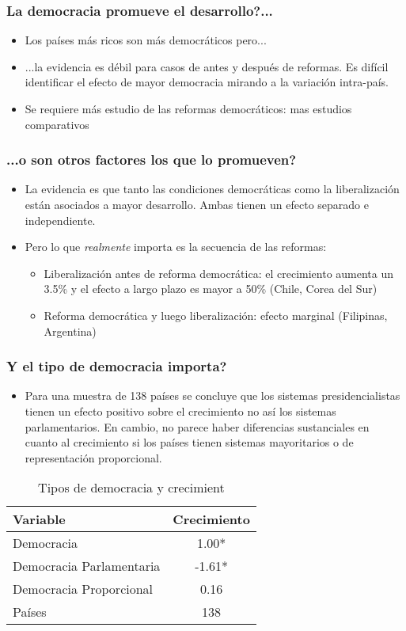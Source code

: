 \documentclass[handout,final,xcolor=dvipsnames]{beamer}
\begin{document}
\begin{frame}\frametitle{La democracia promueve el desarrollo?...}
\begin{itemize}\itemsep 15pt
\item Los países más ricos son más democráticos pero...
\item ...la evidencia es débil para casos de antes y después de reformas. Es difícil identificar
el efecto de mayor democracia mirando a la variación intra-país.
\item Se requiere más estudio de las reformas democráticos: mas estudios comparativos
\end{itemize}
\end{frame}



\begin{frame}\frametitle{...o son otros factores los que lo
    promueven?}
\begin{itemize}\itemsep 15pt
\item La evidencia es que tanto las condiciones democráticas como la liberalización están
asociados a mayor desarrollo. Ambas tienen un efecto separado e independiente.
\item Pero lo que \textit{realmente} importa es la secuencia de las
  reformas:
\begin{itemize}\itemsep 15pt \medskip
\item Liberalización antes de reforma democrática: el crecimiento aumenta un 3.5\% y el
efecto a largo plazo es mayor a 50\% (Chile, Corea del Sur)
\item Reforma democrática y luego liberalización: efecto marginal (Filipinas, Argentina)
\end{itemize}
\end{itemize}
\end{frame}


\begin{frame}\frametitle{Y el tipo de democracia importa?}
\begin{itemize}\itemsep 15pt
\item Para una muestra de 138 países se concluye que los sistemas presidencialistas tienen
un efecto positivo sobre el crecimiento no así los sistemas parlamentarios. En cambio,
no parece haber diferencias sustanciales en cuanto al crecimiento si los países tienen
sistemas mayoritarios o de representación proporcional.
\end{itemize}
\begin{table}[htbp]
  \centering
  \begin{tabular}[htbp]{lc}
    Variable & Crecimiento \\ \hline\hline
Democracia & 1.00* \\
Democracia Parlamentaria & -1.61* \\
Democracia Proporcional & 0.16 \\
Países & 138 \\ \hline
  \end{tabular}
  \caption{Tipos de democracia y crecimient}
  \label{tab:dm}
\end{table}
\end{frame}
\end{document}
